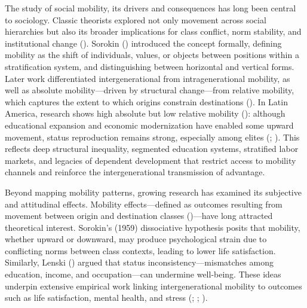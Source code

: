 \documentclass[
  12pt,
]{article}
\begin{document}
The study of social mobility, its drivers and consequences has long been
central to sociology. Classic theorists explored not only movement
across social hierarchies but also its broader implications for class
conflict, norm stability, and institutional change
(). Sorokin
() introduced the concept
formally, defining mobility as the shift of individuals, values, or
objects between positions within a stratification system, and
distinguishing between horizontal and vertical forms. Later work
differentiated intergenerational from intragenerational mobility, as
well as absolute mobility---driven by structural change---from relative
mobility, which captures the extent to which origins constrain
destinations (). In
Latin America, research shows high absolute but low relative mobility
(): although educational
expansion and economic modernization have enabled some upward movement,
status reproduction remains strong, especially among elites
(; ). This
reflects deep structural inequality, segmented education systems,
stratified labor markets, and legacies of dependent development that
restrict access to mobility channels and reinforce the intergenerational
transmission of advantage.

Beyond mapping mobility patterns, growing research has examined its
subjective and attitudinal effects. Mobility effects---defined as
outcomes resulting from movement between origin and destination classes
()---have long
attracted theoretical interest. Sorokin's (1959) dissociative hypothesis
posits that mobility, whether upward or downward, may produce
psychological strain due to conflicting norms between class contexts,
leading to lower life satisfaction. Similarly, Lenski
() argued that status
inconsistency---mismatches among education, income, and occupation---can
undermine well-being. These ideas underpin extensive empirical work
linking intergenerational mobility to outcomes such as life
satisfaction, mental health, and stress
(;
;
).
\end{document}

